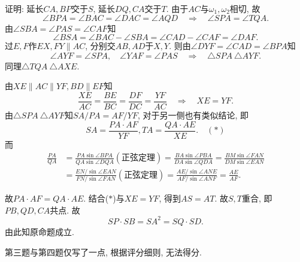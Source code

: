 \documentclass{article}
\begin{document}
证明: 延长$CA, BP$交于$S$, 延长$DQ, CA$交于$T$. 由于$AC$与$\omega_1,\omega_2$相切, 故
\[\angle BPA=\angle BAC=\angle DAC=\angle AQD\quad\Rightarrow\quad\angle SPA=\angle TQA.\]
由$\angle SBA=\angle PAS=\angle CAF$知
\[\angle BSA=\angle BAC-\angle SBA=\angle CAD-\angle CAF=\angle DAF.\]
过$E,F$作$EX,FY\parallel AC$, 分别交$AB,AD$于$X,Y$. 则由$\angle DYF=\angle CAD=\angle BPA$知
\[\angle AYF=\angle SPA,\quad \angle YAF=\angle PAS\quad\Rightarrow\quad\triangle SPA~\triangle AYF.\]
同理$\triangle TQA~\triangle AXE.$\par 
由$XE\parallel AC\parallel YF, BD\parallel EF$知
\[\frac{XE}{AC}=\frac{BE}{BC}=\frac{DF}{DC}=\frac{YF}{AC}\quad\Rightarrow\quad XE=YF.\]
由$\triangle SPA~\triangle AYF$知$SA/PA=AF/YF$, 对于另一侧也有类似结论, 即
\[SA=\frac{PA\cdot AF}{YF}, TA=\frac{QA\cdot AE}{XE}.\quad(\ast)\]
而
\begin{align*}
\frac{PA}{QA}&=\frac{PA\sin\angle BPA}{QA\sin\angle DQA}(\text{正弦定理})=\frac{BA\sin\angle PBA}{DA\sin\angle QDA}=\frac{BM\sin\angle FAN}{DM\sin\angle EAN}\\
&=\frac{EN/\sin\angle EAN}{FN/\sin\angle FAN}(\text{正弦定理})
=\frac{AE/\sin\angle ANE}{AF/\sin\angle ANF}=\frac{AE}{AF}.
\end{align*}

故$PA\cdot AF=QA\cdot AE$. 结合($\ast$)与$XE=YF$, 得到$AS=AT$. 故$S, T$重合, 即$PB, QD, CA$共点. 故
\[SP\cdot SB=SA^2=SQ\cdot SD.\]
由此知原命题成立.\\\par 
第三题与第四题仅写了一点, 根据评分细则, 无法得分.
\end{document}
